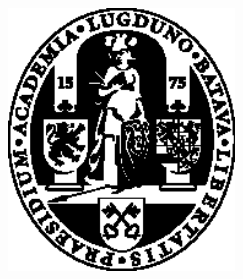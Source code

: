 %




\begin{titlepage}
	\centering

	{\Large \thesisUniversity} \\[4mm]
	\includegraphics[width=6cm]{figs/ullogo} \\[2mm]
	\textsf{\thesisUniversityDepartment} \\
	\textsf{\thesisUniversityInstitute} \\
	\textsf{\thesisUniversityGroup} \\

	\vfill
	{\large \thesisSubject} \\[5mm]
	{\LARGE \color{ctcolortitle}\textbf{\thesisTitle} \\[10mm]}
	{\Large \thesisName} \\


\end{titlepage}

